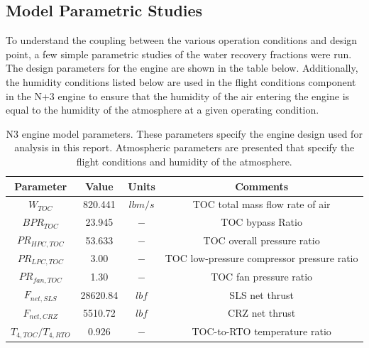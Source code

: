 \documentclass[conf]{new-aiaa}
\begin{document}
\subsection{Model Parametric Studies}
To understand the coupling between the various operation conditions and design point, a few simple parametric studies of the water recovery fractions were run.
The design parameters for the engine are shown in the table below.
Additionally, the humidity conditions listed below are used in the flight conditions component in the N+3 engine to ensure that the humidity of the air entering the engine is equal to the humidity of the atmosphere at a given operating condition.

\begin{table}[hbt!]
    \centering
    \caption{
        N3 engine model parameters.
        These parameters specify the engine design used for analysis in this report.
        Atmospheric parameters are presented that specify the flight conditions and humidity of the atmosphere.}
    \begin{tabular}{c c c c}
        \hline
        Parameter             & Value    & Units                 & Comments                                   \\
        \hline
        $W_{TOC}$             & 820.441  & $lbm/s$               & TOC total mass flow rate of air            \\
        $BPR_{TOC}$           & 23.945   & $-$                   & TOC bypass Ratio                           \\
        $PR_{HPC,TOC}$        & 53.633   & $-$                   & TOC overall pressure ratio                 \\
        $PR_{LPC,TOC}$        & 3.00     & $-$                   & TOC low-pressure compressor pressure ratio \\
        $PR_{fan,TOC}$        & 1.30     & $-$                   & TOC fan pressure ratio                     \\
        $F_{net,SLS}$         & 28620.84 & $lbf$                 & SLS net thrust                             \\
        $F_{net,CRZ}$         & 5510.72  & $lbf$                 & CRZ net thrust                             \\
        $T_{4,TOC}/T_{4,RTO}$ & 0.926    & $-$                   & TOC-to-RTO temperature ratio               \\

\end{tabular}
\end{table}
\end{document}
